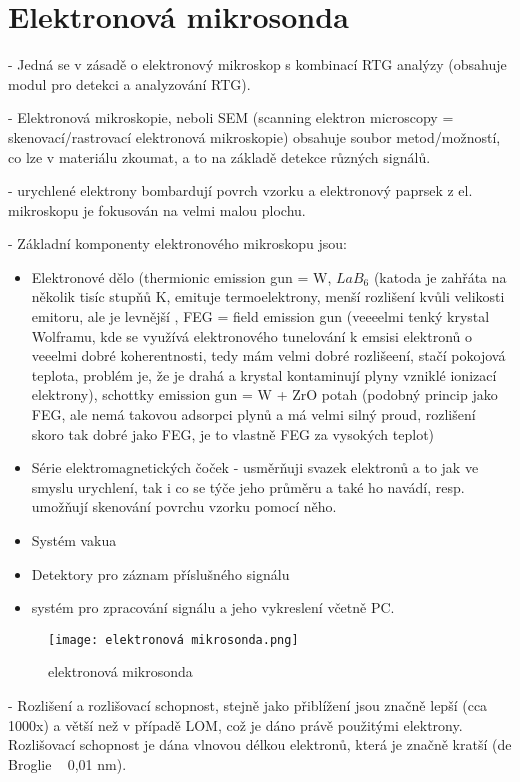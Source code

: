 \section{Elektronová mikrosonda}

- Jedná se v zásadě o elektronový mikroskop s kombinací RTG analýzy (obsahuje modul pro detekci a analyzování RTG).

- Elektronová mikroskopie, neboli SEM (scanning elektron microscopy = skenovací/rastrovací elektronová mikroskopie) obsahuje soubor metod/možností, co lze v materiálu zkoumat, a to na základě detekce různých signálů.

- urychlené elektrony bombardují povrch vzorku a elektronový paprsek z el. mikroskopu je fokusován na velmi malou plochu.

- Základní komponenty elektronového mikroskopu jsou: \begin{itemize}
    \item Elektronové dělo (thermionic emission gun = W, $LaB_6$ (katoda je zahřáta na několik tisíc stupňů K, emituje termoelektrony, menší rozlišení kvůli velikosti emitoru, ale je levnější , FEG = field emission gun (veeeelmi tenký krystal Wolframu, kde se využívá elektronového tunelování k emsisi elektronů o veeelmi dobré koherentnosti, tedy mám velmi dobré rozlišeení, stačí pokojová teplota, problém je, že je drahá a krystal kontaminují plyny vzniklé ionizací elektrony), schottky emission gun = W + ZrO potah (podobný princip jako FEG, ale nemá takovou adsorpci plynů a má velmi silný proud, rozlišení skoro tak dobré jako FEG, je to vlastně FEG za vysokých teplot) 
    \item Série elektromagnetických čoček - usměrňuji svazek elektronů a to jak ve smyslu urychlení, tak i co se týče jeho průměru a také ho navádí, resp. umožňují skenování povrchu vzorku pomocí něho.
    \item Systém vakua
    \item Detektory pro záznam příslušného signálu
    \item systém pro zpracování signálu a jeho vykreslení včetně PC.
\end{itemize} 


\begin{figure}[ht!]
    \centering
    \texttt{[image: elektronová mikrosonda.png]}
    \caption{elektronová mikrosonda}
\end{figure}

- Rozlišení a rozlišovací schopnost, stejně jako přiblížení jsou značně lepší (cca 1000x) a větší než v případě LOM, což je dáno právě použitými elektrony. Rozlišovací schopnost je dána vlnovou délkou elektronů, která je značně kratší (de Broglie ~ 0,01 nm). 


